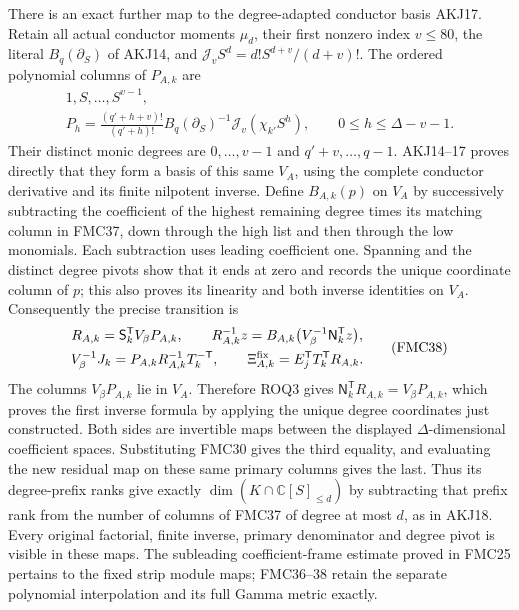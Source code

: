 \documentclass[11pt,a4paper]{article}
\begin{document}
There is an exact further map to the degree-adapted conductor
basis AKJ17. Retain all actual conductor moments $\mu_d$, their
first nonzero index $v\le80$, the literal $B_q(\partial_S)$ of
AKJ14, and $\mathcal J_v S^d=d!S^{d+v}/(d+v)!$. The ordered
polynomial columns of $P_{A,k}$ are
\[
 \begin{gathered}
 1,S,\ldots,S^{v-1},\\
 P_h=\frac{(q'+h+v)!}{(q'+h)!}
       B_q(\partial_S)^{-1}\mathcal J_v(\chi_{k'}S^h),
               \qquad 0\le h\le\Delta-v-1.
 \end{gathered}\tag{FMC37}
\]
Their distinct monic degrees are $0,\ldots,v-1$ and
$q'+v,\ldots,q-1$. AKJ14--17 proves directly that they form a
basis of this same $V_A$, using the complete conductor derivative
and its finite nilpotent inverse. Define $B_{A,k}(p)$ on $V_A$
by successively subtracting the coefficient of the highest
remaining degree times its matching column in FMC37, down
through the high list and then through the low monomials.
Each subtraction uses leading coefficient one. Spanning and the
distinct degree pivots show that it ends at zero and records the
unique coordinate column of $p$; this also proves its linearity
and both inverse identities on $V_A$.
Consequently the precise transition is
\[
 \begin{gathered}
 R_{A,k}=\mathsf S_k^{\mathsf T}V_\beta P_{A,k},\qquad
 R_{A,k}^{-1}z=B_{A,k}\bigl(V_\beta^{-1}\mathsf N_k^{\mathsf T}z\bigr),\\
 V_\beta^{-1}J_k=P_{A,k}R_{A,k}^{-1}T_k^{-\mathsf T},\qquad
 \Xi_{A,k}^{\rm fix}=E_j^{\mathsf T}T_k^{\mathsf T}R_{A,k}.
 \end{gathered}\tag{FMC38}
\]
The columns $V_\beta P_{A,k}$ lie in $V_A$. Therefore ROQ3 gives
$\mathsf N_k^{\mathsf T}R_{A,k}=V_\beta P_{A,k}$, which proves
the first inverse formula by applying the unique degree
coordinates just constructed. Both sides are invertible maps
between the displayed $\Delta$-dimensional coefficient spaces.
Substituting FMC30 gives the third equality, and evaluating
the new residual map on these same primary columns gives the
last. Thus its degree-prefix ranks give exactly
$\dim(K\cap\mathbb C[S]_{\le d})$ by subtracting that prefix
rank from the number of columns of FMC37 of degree at most $d$,
as in AKJ18. Every original factorial, finite inverse, primary
denominator and degree pivot is visible in these maps. The
subleading coefficient-frame estimate proved in FMC25 pertains
to the fixed strip module maps; FMC36--38 retain the separate
polynomial interpolation and its full Gamma metric exactly.
\end{document}
